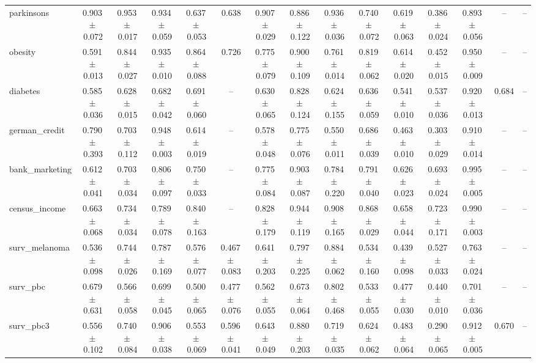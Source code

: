 \documentclass[8pt]{extarticle}
\begin{document}
\begin{longtable}{l*{14}{c}}
parkinsons & 0.903\,$\pm$\,0.072 & 0.953\,$\pm$\,0.017 & 0.934\,$\pm$\,0.059 & 0.637\,$\pm$\,0.053 & 0.638 & 0.907\,$\pm$\,0.029 & 0.886\,$\pm$\,0.122 & 0.936\,$\pm$\,0.036 & 0.740\,$\pm$\,0.072 & 0.619\,$\pm$\,0.063 & 0.386\,$\pm$\,0.024 & 0.893\,$\pm$\,0.056 & -- & -- \\
obesity & 0.591\,$\pm$\,0.013 & 0.844\,$\pm$\,0.027 & 0.935\,$\pm$\,0.010 & 0.864\,$\pm$\,0.088 & 0.726 & 0.775\,$\pm$\,0.079 & 0.900\,$\pm$\,0.109 & 0.761\,$\pm$\,0.014 & 0.819\,$\pm$\,0.062 & 0.614\,$\pm$\,0.020 & 0.452\,$\pm$\,0.015 & 0.950\,$\pm$\,0.009 & -- & -- \\
diabetes & 0.585\,$\pm$\,0.036 & 0.628\,$\pm$\,0.015 & 0.682\,$\pm$\,0.042 & 0.691\,$\pm$\,0.060 & -- & 0.630\,$\pm$\,0.065 & 0.828\,$\pm$\,0.124 & 0.624\,$\pm$\,0.155 & 0.636\,$\pm$\,0.059 & 0.541\,$\pm$\,0.010 & 0.537\,$\pm$\,0.036 & 0.920\,$\pm$\,0.013 & 0.684 & -- \\
german\_credit & 0.790\,$\pm$\,0.393 & 0.703\,$\pm$\,0.112 & 0.948\,$\pm$\,0.003 & 0.614\,$\pm$\,0.019 & -- & 0.578\,$\pm$\,0.048 & 0.775\,$\pm$\,0.076 & 0.550\,$\pm$\,0.011 & 0.686\,$\pm$\,0.039 & 0.463\,$\pm$\,0.010 & 0.303\,$\pm$\,0.029 & 0.910\,$\pm$\,0.014 & -- & -- \\
bank\_marketing & 0.612\,$\pm$\,0.041 & 0.703\,$\pm$\,0.034 & 0.806\,$\pm$\,0.097 & 0.750\,$\pm$\,0.033 & -- & 0.775\,$\pm$\,0.084 & 0.903\,$\pm$\,0.087 & 0.784\,$\pm$\,0.220 & 0.791\,$\pm$\,0.040 & 0.626\,$\pm$\,0.023 & 0.693\,$\pm$\,0.024 & 0.995\,$\pm$\,0.005 & -- & -- \\
census\_income & 0.663\,$\pm$\,0.068 & 0.734\,$\pm$\,0.034 & 0.789\,$\pm$\,0.078 & 0.840\,$\pm$\,0.163 & -- & 0.828\,$\pm$\,0.179 & 0.944\,$\pm$\,0.119 & 0.908\,$\pm$\,0.165 & 0.868\,$\pm$\,0.029 & 0.658\,$\pm$\,0.044 & 0.723\,$\pm$\,0.171 & 0.990\,$\pm$\,0.003 & -- & -- \\
surv\_melanoma & 0.536\,$\pm$\,0.098 & 0.744\,$\pm$\,0.026 & 0.787\,$\pm$\,0.169 & 0.576\,$\pm$\,0.077 & 0.467\,$\pm$\,0.083 & 0.641\,$\pm$\,0.203 & 0.797\,$\pm$\,0.225 & 0.884\,$\pm$\,0.062 & 0.534\,$\pm$\,0.160 & 0.439\,$\pm$\,0.098 & 0.527\,$\pm$\,0.033 & 0.763\,$\pm$\,0.024 & -- & -- \\
surv\_pbc & 0.679\,$\pm$\,0.631 & 0.566\,$\pm$\,0.058 & 0.699\,$\pm$\,0.045 & 0.500\,$\pm$\,0.065 & 0.477\,$\pm$\,0.076 & 0.562\,$\pm$\,0.055 & 0.673\,$\pm$\,0.064 & 0.802\,$\pm$\,0.468 & 0.533\,$\pm$\,0.055 & 0.477\,$\pm$\,0.030 & 0.440\,$\pm$\,0.010 & 0.701\,$\pm$\,0.036 & -- & -- \\
surv\_pbc3 & 0.556\,$\pm$\,0.102 & 0.740\,$\pm$\,0.084 & 0.906\,$\pm$\,0.038 & 0.553\,$\pm$\,0.069 & 0.596\,$\pm$\,0.041 & 0.643\,$\pm$\,0.049 & 0.880\,$\pm$\,0.203 & 0.719\,$\pm$\,0.035 & 0.624\,$\pm$\,0.062 & 0.483\,$\pm$\,0.064 & 0.290\,$\pm$\,0.065 & 0.912\,$\pm$\,0.005 & 0.670 & -- \\

\end{longtable}
\end{document}
